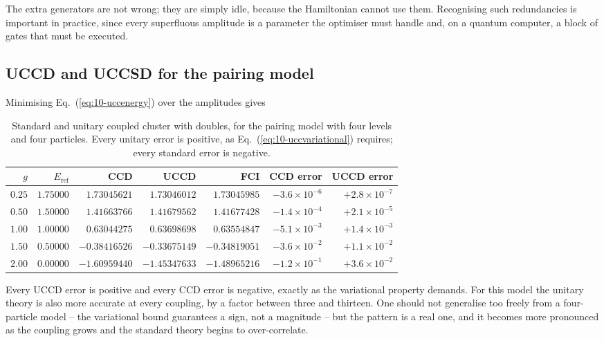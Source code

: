 The extra generators are not wrong; they are simply idle, because the
Hamiltonian cannot use them.  Recognising such redundancies is important in
practice, since every superfluous amplitude is a parameter the optimiser must
handle and, on a quantum computer, a block of gates that must be executed.

\subsection{UCCD and UCCSD for the pairing model}
\label{sec:uccdresults}

Minimising Eq.~(\ref{eq:10-uccenergy}) over the amplitudes gives

\begin{table}[h]
\centering
\renewcommand{\arraystretch}{1.25}
\setlength{\tabcolsep}{7pt}
\small
\begin{tabular}{rrrrrrr}
\toprule
$g$ & $E_{\mathrm{ref}}$ & CCD & UCCD & FCI & CCD error & UCCD error\\
\midrule
$0.25$ & $1.75000$ & $1.73045621$ & $1.73046012$ & $1.73045985$
  & $-3.6\times10^{-6}$ & $+2.8\times10^{-7}$\\
$0.50$ & $1.50000$ & $1.41663766$ & $1.41679562$ & $1.41677428$
  & $-1.4\times10^{-4}$ & $+2.1\times10^{-5}$\\
$1.00$ & $1.00000$ & $0.63044275$ & $0.63698698$ & $0.63554847$
  & $-5.1\times10^{-3}$ & $+1.4\times10^{-3}$\\
$1.50$ & $0.50000$ & $-0.38416526$ & $-0.33675149$ & $-0.34819051$
  & $-3.6\times10^{-2}$ & $+1.1\times10^{-2}$\\
$2.00$ & $0.00000$ & $-1.60959440$ & $-1.45347633$ & $-1.48965216$
  & $-1.2\times10^{-1}$ & $+3.6\times10^{-2}$\\
\bottomrule
\end{tabular}
\caption{Standard and unitary coupled cluster with doubles, for the pairing
model with four levels and four particles.  Every unitary error is positive,
as Eq.~(\ref{eq:10-uccvariational}) requires; every standard error is
negative.}
\label{tab:uccd}
\end{table}

Every UCCD error is positive and every CCD error is negative, exactly as the
variational property demands.  For this model the unitary theory is also more
accurate at every coupling, by a factor between three and thirteen.  One
should not generalise too freely from a four-particle model -- the variational
bound guarantees a sign, not a magnitude -- but the pattern is a real one, and
it becomes more pronounced as the coupling grows and the standard theory
begins to over-correlate.

